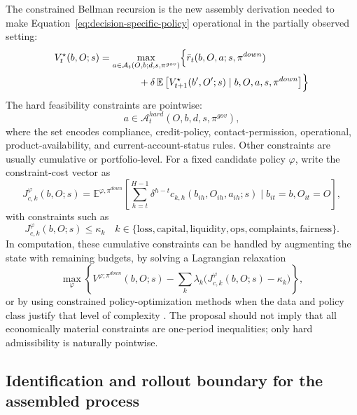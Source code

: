 \documentclass[11pt]{article}
\newcommand{\E}{\mathbb{E}}
\newcommand{\1}{\mathbf{1}}
\begin{document}
The constrained Bellman recursion is the new assembly derivation needed to make
Equation~\eqref{eq:decision-specific-policy} operational in the partially
observed setting:
\begin{align}
  V_t^{\star}(b,O;s)
  &=
  \max_{a\in\mathcal{A}_{t}(O,b;d,s,\pi^{gov})}
  \Bigl\{
    \bar r_t(b,O,a;s,\pi^{down})
    \nonumber\\
    &\qquad\qquad
    + \delta\,\E\left[V_{t+1}^{\star}(b',O';s)\mid b,O,a,s,\pi^{down}\right]
  \Bigr\}
  \label{eq:ss-bellman}
\end{align}
The hard feasibility constraints are pointwise:
\begin{equation}
  a\in \mathcal{A}^{hard}_{t}(O,b,d,s,\pi^{gov}),
  \label{eq:ss-hard-feasible}
\end{equation}
where the set encodes compliance, credit-policy, contact-permission, operational,
product-availability, and current-account-status rules. Other constraints are
usually cumulative or portfolio-level. For a fixed candidate policy $\varphi$,
write the constraint-cost vector as
\begin{equation}
  J^{\varphi}_{c,k}(b,O;s)
  =
  \E^{\varphi,\pi^{down}}\!\left[
    \sum_{h=t}^{H-1}\delta^{h-t}
    c_{k,h}(b_{ih},O_{ih},a_{ih};s)
    \mid b_{it}=b,O_{it}=O
  \right],
  \label{eq:ss-cumulative-constraint}
\end{equation}
with constraints such as
\begin{equation}
  J^{\varphi}_{c,k}(b,O;s)\le \kappa_k
  \quad
  k\in\{\mathrm{loss},\mathrm{capital},\mathrm{liquidity},
  \mathrm{ops},\mathrm{complaints},\mathrm{fairness}\}.
  \label{eq:ss-cmdp-constraints}
\end{equation}
In computation, these cumulative constraints can be handled by augmenting the
state with remaining budgets, by solving a Lagrangian relaxation
\begin{equation}
  \max_{\varphi}
  \left\{
    V^{\varphi;\pi^{down}}(b,O;s)
    -
    \sum_k \lambda_k\bigl(J^{\varphi}_{c,k}(b,O;s)-\kappa_k\bigr)
  \right\},
  \label{eq:ss-lagrangian-cmdp}
\end{equation}
or by using constrained policy-optimization methods when the data and policy
class justify that level of complexity \citep{achiam2017cpo}. The proposal should
not imply that all economically material constraints are one-period inequalities;
only hard admissibility is naturally pointwise.

\subsection{Identification and rollout boundary for the assembled process}
\label{subsec:state-space-identification-boundary}
\end{document}
